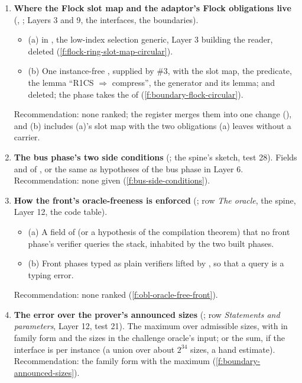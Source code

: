 \begin{enumerate}[leftmargin=*, itemsep=6pt]
\item \textbf{Where the Flock slot map and the adaptor's Flock obligations live} (,
  ; Layers 3 and 9, the interfaces, the boundaries).
  \begin{itemize}[label={}, leftmargin=1.2em]
  \item (a)  in , the low-index
    selection generic, Layer 3 building the reader,  deleted
    (\cref{f:flock-ring-slot-map-circular}).
  \item (b) One instance-free , supplied by \#3, with the slot map, the predicate,
    the lemma \enquote{R1CS $⇒$ compress}, the generator and its lemma;  and
     deleted; the phase takes the  of 
    (\cref{f:boundary-flock-circular}).
  \end{itemize}
  Recommendation: none ranked; the register merges them into one change (), and (b)
  includes (a)'s slot map with the two obligations (a) leaves without a carrier.

\item \textbf{The bus phase's two side conditions} (; the spine's sketch, test 28).
  Fields  and  of , or the same as
  hypotheses of the bus phase in Layer 6. Recommendation: none given (\cref{f:bus-side-conditions}).

\item \textbf{How the front's oracle-freeness is enforced} (; row \emph{The oracle},
  the spine, Layer 12, the code table).
  \begin{itemize}[label={}, leftmargin=1.2em]
  \item (a) A field of  (or a hypothesis of the compilation theorem) that no front
    phase's verifier queries the stack, inhabited by the two built phases.
  \item (b) Front phases typed as plain verifiers lifted by , so that a query is
    a typing error.
  \end{itemize}
  Recommendation: none ranked (\cref{f:obl-oracle-free-front}).

\item \textbf{The error over the prover's announced sizes} (; row \emph{Statements and
  parameters}, Layer 12, test 21). The maximum over admissible sizes, with
   in family form and the sizes in the challenge oracle's input; or the
  sum, if the interface is per instance (a union over about $2^{34}$ sizes, a hand estimate).
  Recommendation: the family form with the maximum (\cref{f:boundary-announced-sizes}).


\end{enumerate}
